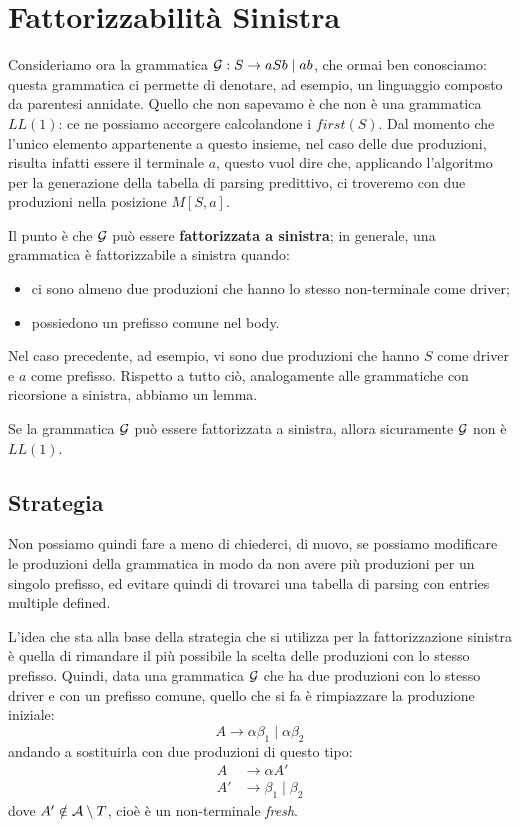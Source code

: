 \documentclass[class=book, crop=false, oneside, 12pt]{standalone}
\begin{document}
\section{Fattorizzabilità Sinistra}
Consideriamo ora la grammatica \(\mathcal{G}: S \rightarrow aSb \mid ab\), che ormai ben conosciamo: questa grammatica ci permette di denotare, ad esempio, un linguaggio composto da parentesi annidate. Quello che non sapevamo è che non è una grammatica \(LL(1)\): ce ne possiamo accorgere calcolandone i \(first(S)\). Dal momento che l'unico elemento appartenente a questo insieme, nel caso delle due produzioni, risulta infatti essere il terminale \(a\), questo vuol dire che, applicando l'algoritmo per la generazione della tabella di parsing predittivo, ci troveremo con due produzioni nella posizione \(M[S, a]\).

Il punto è che \(\mathcal{G}\) può essere \textbf{fattorizzata a sinistra}; in generale, una grammatica è fattorizzabile a sinistra quando:
\begin{itemize}
    \item ci sono almeno due produzioni che hanno lo stesso non-terminale come driver;
    \item possiedono un prefisso comune nel body.
\end{itemize}
Nel caso precedente, ad esempio, vi sono due produzioni che hanno \(S\) come driver e \(a\) come prefisso. Rispetto a tutto ciò, analogamente alle grammatiche con ricorsione a sinistra, abbiamo un lemma.

\begin{lemma}
    Se la grammatica \(\mathcal{G}\) può essere fattorizzata a sinistra, allora sicuramente \(\mathcal{G}\) non è \(LL(1)\).    
\end{lemma}

\subsection{Strategia}
Non possiamo quindi fare a meno di chiederci, di nuovo, se possiamo modificare le produzioni della grammatica in modo da non avere più produzioni per un singolo prefisso, ed evitare quindi di trovarci una tabella di parsing con entries multiple defined.

L'idea che sta alla base della strategia che si utilizza per la fattorizzazione sinistra è quella di rimandare il più possibile la scelta delle produzioni con lo stesso prefisso. Quindi, data una grammatica \(\mathcal{G}\) che ha due produzioni con lo stesso driver e con un prefisso comune, quello che si fa è rimpiazzare la produzione iniziale:
\begin{equation*}
    A \rightarrow \alpha \beta_1 \mid \alpha \beta_2  
\end{equation*}
andando a sostituirla con due produzioni di questo tipo:
\begin{align*}
    A &\rightarrow \alpha A' \\
    A' &\rightarrow \beta_1 \mid \beta_2        
\end{align*}
dove \(A' \notin \mathcal{A} \setminus T\), cioè è un non-terminale \emph{fresh}.
\end{document}
